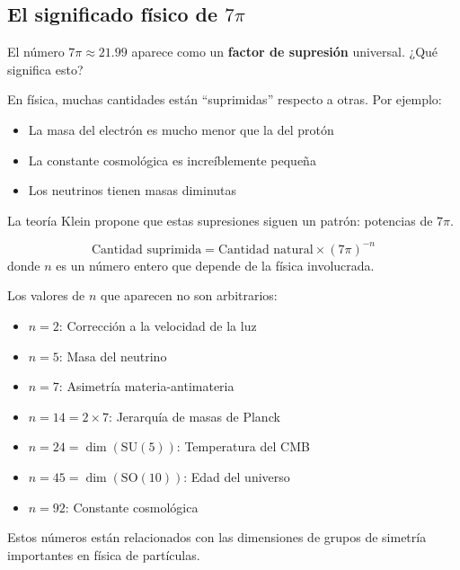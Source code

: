 \documentclass[12pt,a4paper,openany]{book}
\begin{document}
\begin{nivelconceptual}

\section*{El significado físico de $7\pi$}

El número $7\pi \approx 21.99$ aparece como un \textbf{factor de supresión} universal. ¿Qué significa esto?

En física, muchas cantidades están ``suprimidas'' respecto a otras. Por ejemplo:
\begin{itemize}
    \item La masa del electrón es mucho menor que la del protón
    \item La constante cosmológica es increíblemente pequeña
    \item Los neutrinos tienen masas diminutas
\end{itemize}

La teoría Klein propone que estas supresiones siguen un patrón: potencias de $7\pi$.

\begin{formulabox}
\begin{equation}
    \text{Cantidad suprimida} = \text{Cantidad natural} \times (7\pi)^{-n}
\end{equation}
donde $n$ es un número entero que depende de la física involucrada.
\end{formulabox}

Los valores de $n$ que aparecen no son arbitrarios:
\begin{itemize}
    \item $n = 2$: Corrección a la velocidad de la luz
    \item $n = 5$: Masa del neutrino
    \item $n = 7$: Asimetría materia-antimateria
    \item $n = 14 = 2 \times 7$: Jerarquía de masas de Planck
    \item $n = 24 = \dim(\text{SU}(5))$: Temperatura del CMB
    \item $n = 45 = \dim(\text{SO}(10))$: Edad del universo
    \item $n = 92$: Constante cosmológica
\end{itemize}

Estos números están relacionados con las dimensiones de grupos de simetría importantes en física de partículas.

\end{nivelconceptual}
\end{document}

